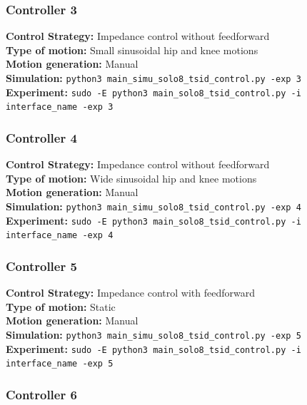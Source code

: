 \documentclass[12pt,a4paper]{article}
\begin{document}
\subsubsection{Controller 3}

\textbf{Control Strategy:} Impedance control without feedforward \\
\textbf{Type of motion:} Small sinusoidal hip and knee motions \\
\textbf{Motion generation:} Manual \\
\textbf{Simulation:} \texttt{python3 main\_simu\_solo8\_tsid\_control.py -exp 3} \\
\textbf{Experiment:} \texttt{sudo -E python3 main\_solo8\_tsid\_control.py -i interface\_name -exp 3} \\

\subsubsection{Controller 4}

\textbf{Control Strategy:} Impedance control without feedforward \\
\textbf{Type of motion:} Wide sinusoidal hip and knee motions \\
\textbf{Motion generation:} Manual \\
\textbf{Simulation:} \texttt{python3 main\_simu\_solo8\_tsid\_control.py -exp 4} \\
\textbf{Experiment:} \texttt{sudo -E python3 main\_solo8\_tsid\_control.py -i interface\_name -exp 4} \\

\subsubsection{Controller 5}

\textbf{Control Strategy:} Impedance control with feedforward \\
\textbf{Type of motion:} Static \\
\textbf{Motion generation:} Manual \\
\textbf{Simulation:} \texttt{python3 main\_simu\_solo8\_tsid\_control.py -exp 5} \\
\textbf{Experiment:} \texttt{sudo -E python3 main\_solo8\_tsid\_control.py -i interface\_name -exp 5} \\

\subsubsection{Controller 6}
\end{document}
